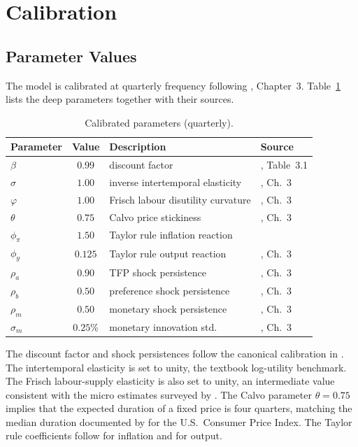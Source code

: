 \section{Calibration}
\label{sec:calibration}

\subsection{Parameter Values}
\label{sec:calibration_params}

The model is calibrated at quarterly frequency following
\citet{Gali2008}, Chapter~3. Table~\ref{tab:calibration} lists the
deep parameters together with their sources.

\begin{table}[t]
  \centering
  \caption{Calibrated parameters (quarterly).}
  \label{tab:calibration}
  \begin{tabular}{lcll}
    \toprule
    Parameter & Value & Description & Source \\
    \midrule
    $\beta$      & $0.99$   & discount factor                 & \citet{Gali2008}, Table~3.1 \\
    $\sigma$     & $1.00$   & inverse intertemporal elasticity & \citet{Gali2008}, Ch.~3 \\
    $\varphi$    & $1.00$   & Frisch labour disutility curvature & \citet{Gali2008}, Ch.~3 \\
    $\theta$     & $0.75$   & Calvo price stickiness          & \citet{Gali2008}, Ch.~3 \\
    $\phi_{\pi}$ & $1.50$   & Taylor rule inflation reaction  & \citet{Taylor1993} \\
    $\phi_{y}$   & $0.125$  & Taylor rule output reaction     & \citet{Gali2008}, Ch.~3 \\
    $\rho_{a}$   & $0.90$   & TFP shock persistence           & \citet{Gali2008}, Ch.~3 \\
    $\rho_{b}$   & $0.50$   & preference shock persistence    & \citet{Gali2008}, Ch.~3 \\
    $\rho_{m}$   & $0.50$   & monetary shock persistence      & \citet{Gali2008}, Ch.~3 \\
    $\sigma_{m}$ & $0.25\%$ & monetary innovation std.        & \citet{Gali2008}, Ch.~3 \\
    \bottomrule
  \end{tabular}
\end{table}

The discount factor and shock persistences follow the canonical
calibration in \citet{Gali2008}. The intertemporal elasticity is set to
unity, the textbook log-utility benchmark. The Frisch labour-supply
elasticity is also set to unity, an intermediate value consistent with
the micro estimates surveyed by \citet{ChettyEtAl2011}. The Calvo
parameter $\theta=0.75$ implies that the expected duration of a fixed
price is four quarters, matching the median duration documented by
\citet{NakamuraSteinsson2008} for the U.S.\ Consumer Price Index. The
Taylor rule coefficients follow \citet{Taylor1993} for inflation and
\citet{Gali2008} for output.

